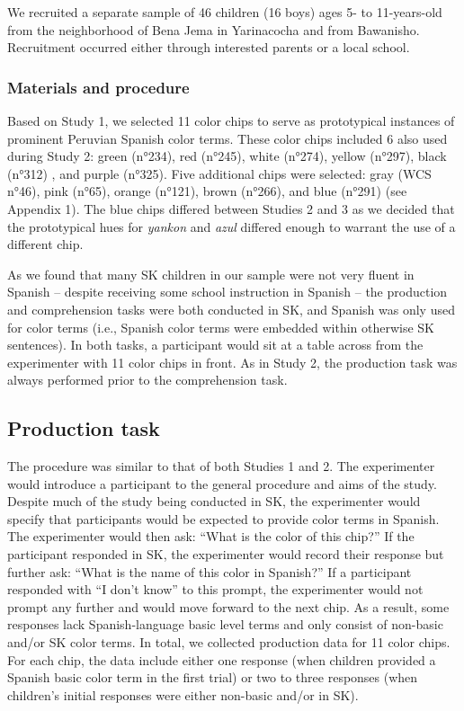 \documentclass[
  english,
  ,apa7,floatsintext]{apa6}
\begin{document}
We recruited a separate sample of 46 children (16 boys) ages 5- to 11-years-old from the neighborhood of Bena Jema in Yarinacocha and from Bawanisho. Recruitment occurred either through interested parents or a local school.

\hypertarget{materials-and-procedure-2}{%
\subsubsection{Materials and procedure}\label{materials-and-procedure-2}}

Based on Study 1, we selected 11 color chips to serve as prototypical instances of prominent Peruvian Spanish color terms. These color chips included 6 also used during Study 2: green (n°234), red (n°245), white (n°274), yellow (n°297), black (n°312) , and purple (n°325). Five additional chips were selected: gray (WCS n°46), pink (n°65), orange (n°121), brown (n°266), and blue (n°291) (see Appendix 1). The blue chips differed between Studies 2 and 3 as we decided that the prototypical hues for \emph{yankon} and \emph{azul} differed enough to warrant the use of a different chip.

As we found that many SK children in our sample were not very fluent in Spanish -- despite receiving some school instruction in Spanish -- the production and comprehension tasks were both conducted in SK, and Spanish was only used for color terms (i.e., Spanish color terms were embedded within otherwise SK sentences). In both tasks, a participant would sit at a table across from the experimenter with 11 color chips in front. As in Study 2, the production task was always performed prior to the comprehension task.

\hypertarget{production-task-1}{%
\subsection{Production task}\label{production-task-1}}

The procedure was similar to that of both Studies 1 and 2. The experimenter would introduce a participant to the general procedure and aims of the study. Despite much of the study being conducted in SK, the experimenter would specify that participants would be expected to provide color terms in Spanish. The experimenter would then ask: ``What is the color of this chip?'' If the participant responded in SK, the experimenter would record their response but further ask: ``What is the name of this color in Spanish?'' If a participant responded with ``I don't know'' to this prompt, the experimenter would not prompt any further and would move forward to the next chip. As a result, some responses lack Spanish-language basic level terms and only consist of non-basic and/or SK color terms. In total, we collected production data for 11 color chips. For each chip, the data include either one response (when children provided a Spanish basic color term in the first trial) or two to three responses (when children's initial responses were either non-basic and/or in SK).
\end{document}
